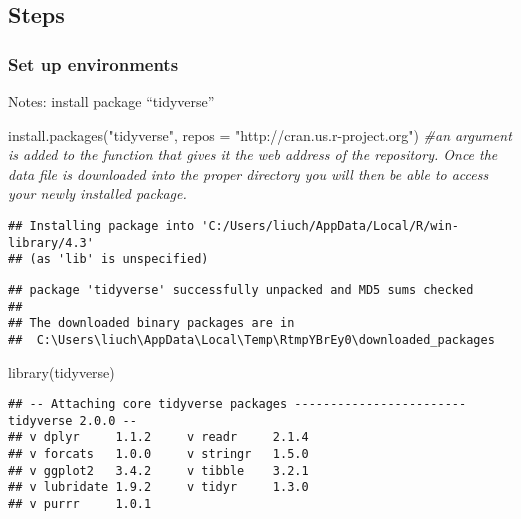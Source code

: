 \documentclass[
]{article}
\newenvironment{Shaded}{\begin{snugshade}}{\end{snugshade}}
\newcommand{\AttributeTok}[1]{\textcolor[rgb]{0.77,0.63,0.00}{#1}}
\newcommand{\CommentTok}[1]{\textcolor[rgb]{0.56,0.35,0.01}{\textit{#1}}}
\newcommand{\FunctionTok}[1]{\textcolor[rgb]{0.00,0.00,0.00}{#1}}
\newcommand{\NormalTok}[1]{#1}
\newcommand{\StringTok}[1]{\textcolor[rgb]{0.31,0.60,0.02}{#1}}
\begin{document}
\hypertarget{steps}{%
\subsection{Steps}\label{steps}}

\hypertarget{set-up-environments}{%
\subsubsection{Set up environments}\label{set-up-environments}}

Notes: install package ``tidyverse''

\begin{Shaded}
\begin{Highlighting}[]
\FunctionTok{install.packages}\NormalTok{(}\StringTok{"tidyverse"}\NormalTok{, }\AttributeTok{repos =} \StringTok{"http://cran.us.r{-}project.org"}\NormalTok{) }\CommentTok{\#an argument is added to the function that gives it the web address of the repository. Once the data file is downloaded into the proper directory you will then be able to access your newly installed package.}
\end{Highlighting}
\end{Shaded}

\begin{verbatim}
## Installing package into 'C:/Users/liuch/AppData/Local/R/win-library/4.3'
## (as 'lib' is unspecified)
\end{verbatim}

\begin{verbatim}
## package 'tidyverse' successfully unpacked and MD5 sums checked
## 
## The downloaded binary packages are in
##  C:\Users\liuch\AppData\Local\Temp\RtmpYBrEy0\downloaded_packages
\end{verbatim}

\begin{Shaded}
\begin{Highlighting}[]
\FunctionTok{library}\NormalTok{(tidyverse)}
\end{Highlighting}
\end{Shaded}

\begin{verbatim}
## -- Attaching core tidyverse packages ------------------------ tidyverse 2.0.0 --
## v dplyr     1.1.2     v readr     2.1.4
## v forcats   1.0.0     v stringr   1.5.0
## v ggplot2   3.4.2     v tibble    3.2.1
## v lubridate 1.9.2     v tidyr     1.3.0
## v purrr     1.0.1
\end{verbatim}
\end{document}
